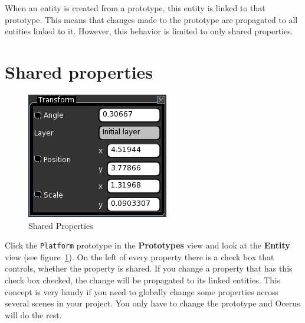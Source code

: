\documentclass[a4paper,12pt]{article}
\begin{document}
When an entity is created from a prototype, this entity is linked to that prototype. This means that changes made to the prototype are propagated to all entities linked to it. However, this behavior is limited to only shared properties.

\section{Shared properties}

\begin{figure}
\vspace{-20pt}
\capstart
\begin{center}
  \includegraphics[scale=0.65]{SharedProperties}
 \end{center}
 \vspace{-20pt}
 \caption{Shared Properties}
 \label{fig:shared_properties}
 \vspace{-10pt}
\end{figure}


Click the \texttt{Platform} prototype in the \textbf{Prototypes} view and look at the \textbf{Entity} view (see figure~\ref{fig:shared_properties}). On the left of every property there is a check box that controls, whether the property is shared. If you change a property that has this check box checked, the change will be propagated to its linked entities. This concept is very handy if you need to globally change some properties across several scenes in your project. You only have to change the prototype and Ocerus will do the rest.
\end{document}
